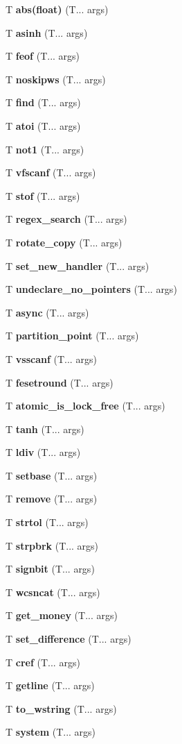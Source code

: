 \begin{DoxyCompactItemize}
T \textbf{ abs(float)} (T... args)
\item 
T \textbf{ asinh} (T... args)
\item 
T \textbf{ feof} (T... args)
\item 
T \textbf{ noskipws} (T... args)
\item 
T \textbf{ find} (T... args)
\item 
T \textbf{ atoi} (T... args)
\item 
T \textbf{ not1} (T... args)
\item 
T \textbf{ vfscanf} (T... args)
\item 
T \textbf{ stof} (T... args)
\item 
T \textbf{ regex\+\_\+search} (T... args)
\item 
T \textbf{ rotate\+\_\+copy} (T... args)
\item 
T \textbf{ set\+\_\+new\+\_\+handler} (T... args)
\item 
T \textbf{ undeclare\+\_\+no\+\_\+pointers} (T... args)
\item 
T \textbf{ async} (T... args)
\item 
T \textbf{ partition\+\_\+point} (T... args)
\item 
T \textbf{ vsscanf} (T... args)
\item 
T \textbf{ fesetround} (T... args)
\item 
T \textbf{ atomic\+\_\+is\+\_\+lock\+\_\+free} (T... args)
\item 
T \textbf{ tanh} (T... args)
\item 
T \textbf{ ldiv} (T... args)
\item 
T \textbf{ setbase} (T... args)
\item 
T \textbf{ remove} (T... args)
\item 
T \textbf{ strtol} (T... args)
\item 
T \textbf{ strpbrk} (T... args)
\item 
T \textbf{ signbit} (T... args)
\item 
T \textbf{ wcsncat} (T... args)
\item 
T \textbf{ get\+\_\+money} (T... args)
\item 
T \textbf{ set\+\_\+difference} (T... args)
\item 
T \textbf{ cref} (T... args)
\item 
T \textbf{ getline} (T... args)
\item 
T \textbf{ to\+\_\+wstring} (T... args)
\item 
T \textbf{ system} (T... args)
\item 

\end{DoxyCompactItemize}
